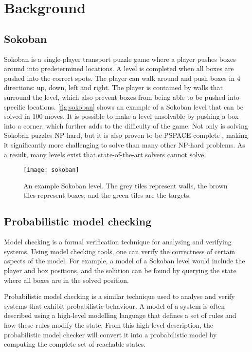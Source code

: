 \section{Background}
\subsection{Sokoban}
Sokoban is a single-player transport puzzle game where a player pushes boxes around into predetermined locations. A level is completed when all boxes are pushed into the correct spots. The player can walk around and push boxes in 4 directions: up, down, left and right. The player is contained by walls that surround the level, which also prevent boxes from being able to be pushed into specific locations. \autoref{fig:sokoban} shows an example of a Sokoban level that can be solved in 100 moves. It is possible to make a level unsolvable by pushing a box into a corner, which further adds to the difficulty of the game. Not only is solving Sokoban puzzles NP-hard, but it is also proven to be PSPACE-complete \cite{pspace-complete}, making it significantly more challenging to solve than many other NP-hard problems. As a result, many levels exist that state-of-the-art solvers cannot solve. 

\begin{figure}[h]
    \centering
    \texttt{[image: sokoban]}
    \caption{An example Sokoban level. The grey tiles represent walls, the brown tiles represent boxes, and the green tiles are the targets.}
    \label{fig:sokoban}
\end{figure}

\subsection{Probabilistic model checking}
Model checking is a formal verification technique for analysing and verifying systems. Using model checking tools, one can verify the correctness of certain aspects of the model. For example, a model of a Sokoban level would include the player and box positions, and the solution can be found by querying the state where all boxes are in the solved position.

Probabilistic model checking is a similar technique used to analyse and verify systems that exhibit probabilistic behaviour. A model of a system is often described using a high-level modelling language that defines a set of rules and how these rules modify the state. From this high-level description, the probabilistic model checker will convert it into a probabilistic model by computing the complete set of reachable states. 

